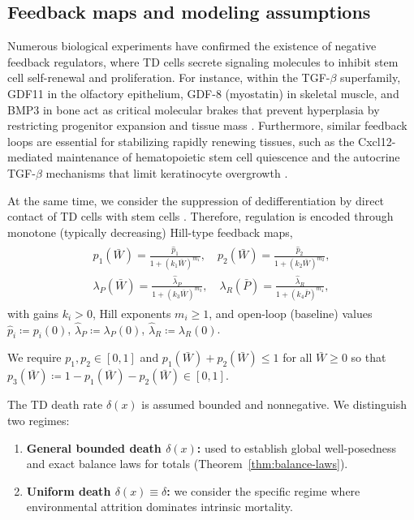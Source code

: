 \documentclass[pdflatex,sn-mathphys-ay]{sn-jnl}
\theoremstyle{thmstyleone}
\theoremstyle{definition}
\theoremstyle{remark}
\begin{document}
\subsection{Feedback maps and modeling assumptions}
\label{subsec:feedback_assumptions}
Numerous biological experiments have confirmed the existence of negative feedback regulators, where TD cells secrete signaling molecules to inhibit stem cell self-renewal and proliferation. For instance, within the TGF-$\beta$ superfamily, GDF11 in the olfactory epithelium, GDF-8 (myostatin) in skeletal muscle, and BMP3 in bone act as critical molecular brakes that prevent hyperplasia by restricting progenitor expansion and tissue mass \citep{wu_autoregulation_2003, mcpherron_regulation_1997, daluiski_bone_2001}. Furthermore, similar feedback loops are essential for stabilizing rapidly renewing tissues, such as the Cxcl12-mediated maintenance of hematopoietic stem cell quiescence and the autocrine TGF-$\beta$ mechanisms that limit keratinocyte overgrowth \citep{tzeng_loss_2011, yamasaki_keratinocyte_2003}.

At the same time, we consider the suppression of dedifferentiation by direct contact of TD cells with stem cells \citep{tata_dedifferentiation_2013,guo_dedifferentiation_2022}. 
Therefore, regulation is encoded through monotone (typically decreasing) Hill-type feedback maps,
\begin{align}\label{eq:Hill_maps}
\begin{aligned}
p_1(\bar W)=\frac{\hat p_1}{1+(k_1\bar W)^{m_1}},\quad
p_2(\bar W)=\frac{\hat p_2}{1+(k_2\bar W)^{m_2}},\\[4pt]
\lambda_P(\bar W)=\frac{\hat\lambda_P}{1+(k_3\bar W)^{m_3}},\quad
\lambda_R(\bar P)=\frac{\hat\lambda_R}{1+(k_4\bar P)^{m_4}},
\end{aligned}
\end{align}
with gains $k_i>0$, Hill exponents $m_i\ge 1$, and open-loop (baseline) values
$\hat p_i\coloneqq p_i(0)$, $\hat\lambda_P\coloneqq \lambda_P(0)$, $\hat\lambda_R\coloneqq \lambda_R(0)$.

We require $p_1,p_2\in[0,1]$ and $p_1(\bar W)+p_2(\bar W)\le 1$ for all $\bar W\ge 0$
so that $p_3(\bar W)\coloneqq 1-p_1(\bar W)-p_2(\bar W)\in[0,1]$.

The TD death rate $\delta(x)$ is assumed bounded and nonnegative. We distinguish two regimes:
\begin{enumerate}[label=(\roman*), leftmargin=2.2em]
\item \textbf{General bounded death $\delta(x)$:} used to establish global well-posedness and exact balance laws for totals (Theorem~\ref{thm:balance-laws}).
\item \textbf{Uniform death $\delta(x)\equiv\delta$:} 
we consider the specific regime where environmental attrition dominates intrinsic mortality. 
\end{enumerate}
\end{document}
